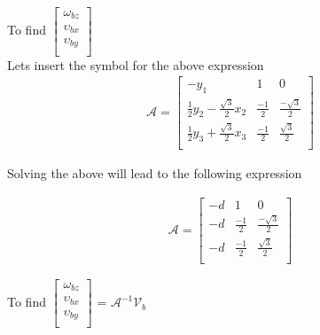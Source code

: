 \documentclass{article}
\begin{document}
To find
$
    \begin{bmatrix}
        \omega_{bz}   \\
        \upsilon_{bx} \\
        \upsilon_{by} \\
    \end{bmatrix}
$\\

Lets insert the symbol for the above expression
\begin{align}
    \mathcal{A}  =
    \begin{bmatrix}
        -y_1                                   & 1            & 0                    \\
        \frac{1}{2}y_2 - \frac{\sqrt{3}}{2}x_2 & \frac{-1}{2} & \frac{- \sqrt{3}}{2} \\
        \frac{1}{2}y_3 + \frac{\sqrt{3}}{2}x_3 & \frac{-1}{2} & \frac{ \sqrt{3}}{2}  \\
    \end{bmatrix}
\end{align}

Solving the above will lead to the following expression

\begin{align}
    \mathcal{A} =
    \begin{bmatrix}
        -d & 1            & 0                    \\
        -d & \frac{-1}{2} & \frac{- \sqrt{3}}{2} \\
        -d & \frac{-1}{2} & \frac{\sqrt{3}}{2}   \\
    \end{bmatrix}
\end{align}

To find
$
    \begin{bmatrix}
        \omega_{bz}   \\
        \upsilon_{bx} \\
        \upsilon_{by} \\
    \end{bmatrix}
$ = $\mathcal{A}^{-1} \mathcal{V}_b$

\end{document}

